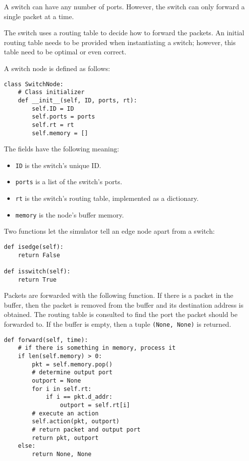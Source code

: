 \documentclass[11pt]{report}
\begin{document}
A switch can have any number of ports. However, the switch can only forward a
single packet at a time.

The switch uses a routing table to decide how to forward the packets. An
initial routing table needs to be provided when instantiating a switch;
however, this table need to be optimal or even correct.

A switch node is defined as follows:

\begin{verbatim}
class SwitchNode:
    # Class initializer
    def __init__(self, ID, ports, rt):
        self.ID = ID
        self.ports = ports
        self.rt = rt
        self.memory = []
\end{verbatim}

The fields have the following meaning:

\begin{itemize}
	\item \texttt{ID} is the switch's unique ID.
	\item \texttt{ports} is a list of the switch's ports.
	\item \texttt{rt} is the switch's routing table, implemented as
		a dictionary.
	\item \texttt{memory} is the node's buffer memory.
\end{itemize}

Two functions let the simulator tell an edge node apart from a switch:

\begin{verbatim}
def isedge(self):
    return False

def isswitch(self):
    return True
\end{verbatim}

Packets are forwarded with the following function. If there is a packet in the
buffer, then the packet is removed from the buffer and its destination address
is obtained. The routing table is consulted to find the port the packet should
be forwarded to. If the buffer is empty, then a tuple
\texttt{(None, None)} is returned.

\begin{verbatim}
def forward(self, time):
    # if there is something in memory, process it
    if len(self.memory) > 0:
        pkt = self.memory.pop()
        # determine output port
        outport = None
        for i in self.rt:
            if i == pkt.d_addr:
                outport = self.rt[i]
        # execute an action
        self.action(pkt, outport)
        # return packet and output port
        return pkt, outport
    else:
        return None, None
\end{verbatim}
\end{document}

